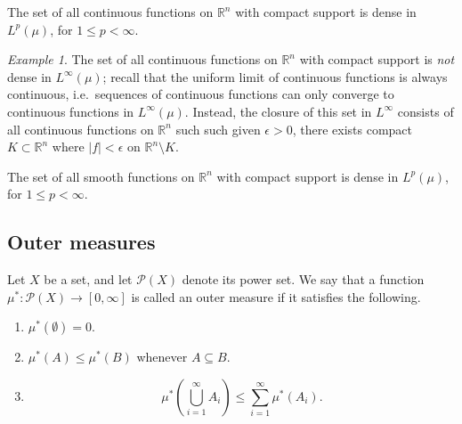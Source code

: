 \documentclass[11pt]{article}
\newcommand{\R}{\mathbb{R}}
\theoremstyle{definition}
\theoremstyle{remark}
\newtheorem*{example}{Example}
\numberwithin{equation}{section}
\begin{document}
    \begin{theorem}
        The set of all continuous functions on $\R^n$ with compact support is dense
        in $L^p(\mu)$, for $1 \leq p < \infty$.
    \end{theorem}
    \begin{example}
        The set of all continuous functions on $\R^n$ with compact support is
        \emph{not} dense in $L^\infty(\mu)$; recall that the uniform limit of
        continuous functions is always continuous, i.e.\ sequences of continuous
        functions can only converge to continuous functions in $L^\infty(\mu)$.
        Instead, the closure of this set in $L^\infty$ consists of all continuous
        functions on $\R^n$ such such given $\epsilon > 0$, there exists compact $K
        \subset \R^n$ where $|f| < \epsilon$ on $\R^n\setminus K$.
    \end{example}

    \begin{theorem}
        The set of all smooth functions on $\R^n$ with compact support is dense in
        $L^p(\mu)$, for $1 \leq p < \infty$.
    \end{theorem}


    \subsection{Outer measures}
    
    \begin{definition}
        Let $X$ be a set, and let $\mathcal{P}(X)$ denote its power set. We say that
        a function $\mu^*\colon \mathcal{P}(X) \to [0, \infty]$ is called an outer
        measure if it satisfies the following.
        \begin{enumerate}
            \itemsep0em
            \item $\mu^*(\emptyset) = 0$.
            \item $\mu^*(A) \leq \mu^*(B)$ whenever $A \subseteq B$.
            \item \[
                \mu^*\left(\bigcup_{i = 1}^\infty A_i\right) \leq \sum_{i = 1}^\infty
                \mu^*(A_i).
            \] 
        \end{enumerate}
    \end{definition}
\end{document}
